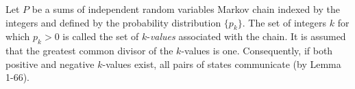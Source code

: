 Let $P$ be a sums of independent random variables Markov chain indexed by the integers and defined by the probability distribution $\{p_k\}$. The set of integers $k$ for which $p_k > 0$ is called the set of $k$-\textit{values} associated with the chain. It is assumed that the greatest common divisor of the $k$-values is one. Consequently, if both positive and negative $k$-values exist, all pairs of states communicate (by Lemma 1-66).
